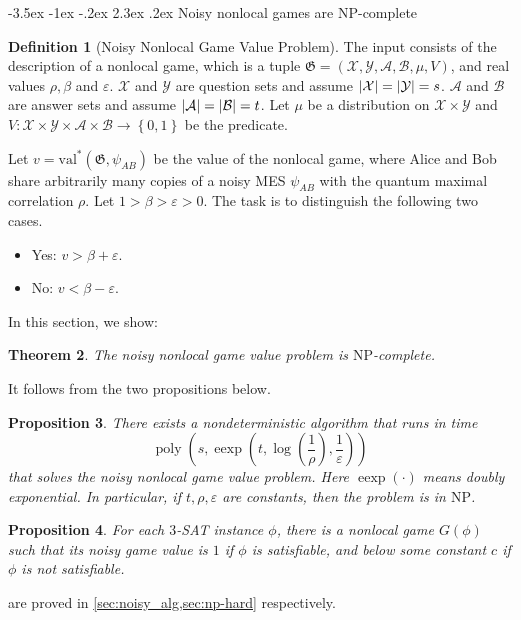 \documentclass[10pt,a4paper]{article}
\makeatletter
\renewcommand{\section}{\@startsection {section}{1}{\z@}%
             {-3.5ex \@plus -1ex \@minus -.2ex}%
             {2.3ex \@plus .2ex}%
             {\normalfont\Large\scshape\bfseries}}
\theoremstyle{plain}
\newtheorem{theorem}{Theorem}[section]
\newtheorem{prop}[theorem]{Proposition}
\theoremstyle{definition}
\newtheorem{definition}[theorem]{Definition}
\newcommand {\set} [1] {\ensuremath{ \left\lbrace #1 \right\rbrace }}
\newcommand {\br} [1] {\ensuremath{ \left( #1 \right) }}
\DeclarePairedDelimiter{\abs}{\lvert}{\rvert}
\newcommand{\poly} {\ensuremath{\operatorname{poly}}}
\newcommand{\ep} {\ensuremath{\varepsilon}}
\newcommand{\calX}{\mathcal{X}}
\newcommand{\calY}{\mathcal{Y}}
\newcommand{\calA}{\mathcal{A}}
\newcommand{\calB}{\mathcal{B}}
\newcommand{\1}{\mathbb{1}} %
\newcommand{\val}{\mathrm{val}}
\newcommand{\NP}{\mathrm{NP}}
\makeatother
\begin{document}
%
\section{Noisy nonlocal games are NP-complete}

\begin{definition}[Noisy Nonlocal Game Value Problem]\label{def:nonlocalgameproblem}
The input consists of the description of a nonlocal game,
which is a tuple $\mathfrak{G}=\br{\calX, \calY, \calA, \calB, \mu, V}$,
and real values $\rho, \beta$ and $\ep$.
$\calX$ and $\calY$ are question sets and assume $\abs{\calX} = \abs{\calY} = s$.
$\calA$ and $\calB$ are answer sets and assume $\abs{\calA} = \abs{\calB} = t$.
Let $\mu$ be a distribution on $\calX\times\calY$ and $V: \calX\times\calY\times\calA\times\calB\to\set{0,1}$ be the predicate.

Let $v=\val^\ast(\mathfrak{G}, \psi_{AB})$ be the value of the nonlocal game,
where Alice and Bob share arbitrarily many copies of a noisy MES $\psi_{AB}$ with the quantum maximal correlation $\rho$.
Let $1>\beta> \ep>0$. The task is to distinguish the following two cases.
\begin{itemize}
    \item Yes: $v>\beta+\ep$.
    \item No: $v<\beta-\ep$.
\end{itemize}
\end{definition}
In this section, we show: 
\begin{theorem}
    The noisy nonlocal game value problem is $\NP$-complete.
\end{theorem}
It follows from the two propositions below.

\begin{prop}\label{thm:nonlocal-game-is-NP}
  There exists a nondeterministic algorithm that runs in time
  $$\poly\br{s, \operatorname{eexp}\br{t, \log\br{\frac{1}{\rho}}, \frac{1}{\ep}}}$$
  that solves the noisy nonlocal game value problem.
  Here $\operatorname{eexp}(\cdot)$ means doubly exponential.
  In particular, if $t, \rho, \ep$ are constants, then the problem is in $\mathrm{NP}$.
\end{prop}
\begin{prop}
    \label{prop:noisy-np-hard}
    For each $3$-SAT instance $\phi$, there is a nonlocal game $G(\phi)$ such that
    its noisy game value is $1$ if $\phi$ is satisfiable, and below some constant $c$ if
    $\phi$ is not satisfiable.
\end{prop}
 are proved in \cref{sec:noisy_alg,sec:np-hard} respectively.
\end{document}
